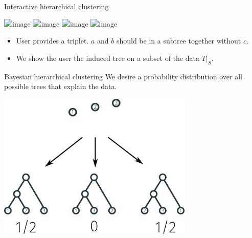 \documentclass[10pt, compress]{beamer}
\begin{document}
\begin{frame}{Interactive hierarchical clustering}
  \begin{center}
    \includegraphics<1>[width=\textwidth]{img/interaction-0}
    \includegraphics<2>[width=\textwidth]{img/interaction-1}
    \includegraphics<3>[width=\textwidth]{img/interaction-2}
    \includegraphics<4->[width=\textwidth]{img/interaction-3}
  \end{center}
  \begin{itemize}
    \item<4-> User provides a \alert{triplet}. $a$ and $b$
  should be in a subtree together without $c$.
    \item<5-> We show the user the induced tree on a subset of the data $T|_S$.
  \end{itemize}
\end{frame}

\begin{frame}{Bayesian hierarchical clustering}
  We desire a probability distribution over all possible
  trees that explain the data.

    \pause
  \begin{center}
    \includegraphics[width=0.7\textwidth]{img/3-cluster-linear-distribution.png}
  \end{center}
\end{frame}
\end{document}
